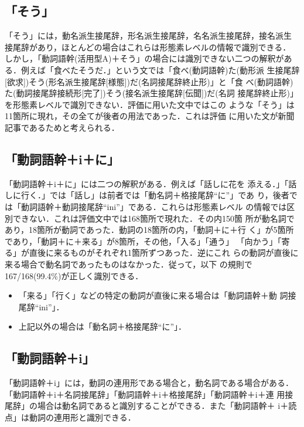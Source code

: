 \subsection{「そう」}
「そう」には，動名派生接尾辞，形名派生接尾辞，名名派生接尾辞，接名派生
接尾辞があり，ほとんどの場合はこれらは形態素レベルの情報で識別できる．
しかし，「動詞語幹(活用型A)＋そう」の場合には識別できない二つの解釈があ
る．例えば「食べたそうだ．」という文では「食べ(動詞語幹)た(動形派
生接尾辞[欲求])そう(形名派生接尾辞[様態])だ(名詞接尾辞終止形)」と「食
べ(動詞語幹)た(動詞接尾辞接続形[完了])そう(接名派生接尾辞[伝聞])だ(名詞
接尾辞終止形)」を形態素レベルで識別できない．評価に用いた文中ではこの
ような「そう」は11箇所に現れ，その全てが後者の用法であった．これは評価
に用いた文が新聞記事であるためと考えられる．

\subsection{「動詞語幹＋i＋に」}
「動詞語幹＋i＋に」には二つの解釈がある．例えば「話しに花を
添える．」「話しに行く．」では「話し」は前者では「動名詞＋格接尾辞``に''」であ
り，後者では「動詞語幹＋動詞接尾辞``ini''」である．これらは形態素レベル
の情報では区別できない．これは評価文中では168箇所で現れた．その内150箇
所が動名詞であり，18箇所が動詞であった．動詞の18箇所の内，「動詞＋に＋行
く」が5箇所であり，「動詞＋に＋来る」が8箇所，その他，「入る」「通う」
「向かう」「寄る」が直後に来るものがそれぞれ1箇所ずつあった．逆にこれ
らの動詞が直後に来る場合で動名詞であったものはなかった．従って，以下
の規則で167/168(99.4\%)が正しく識別できる．
\begin{itemize}
\item 「来る」「行く」などの特定の動詞が直後に来る場合は「動詞語幹＋動
詞接尾辞``ini''」．
\item 上記以外の場合は「動名詞＋格接尾辞``に''」．
\end{itemize}


\subsection{「動詞語幹＋i」}
「動詞語幹＋i」には，動詞の連用形である場合と，動名詞である場合がある．
「動詞語幹＋i＋名詞接尾辞」「動詞語幹＋i＋格接尾辞」「動詞語幹＋i＋連
用接尾辞」の場合は動名詞であると識別することができる．また「動詞語幹＋
i＋読点」は動詞の連用形と識別できる．

